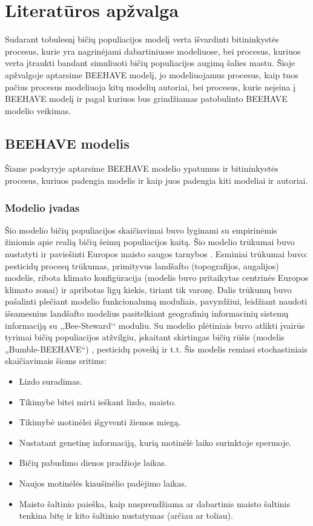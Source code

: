 \documentclass{VUMIFKompMagistrinis}
\begin{document}
\section{Literatūros apžvalga}

Sudarant tobulesnį bičių populiacijos modelį verta išvardinti bitininkystės procesus, kurie yra nagrinėjami dabartiniuose modeliuose, bei procesus, kuriuos verta įtraukti bandant simuliuoti bičių populiacijos augimą šalies mastu. Šioje apžvalgoje aptarsime BEEHAVE modelį, jo modeliuojamus procesus, kaip tuos pačius procesus modeliuoja kitų modelių autoriai, bei procesus, kurie neįeina į BEEHAVE modelį ir pagal kuriuos bus grindžiamas patobulinto BEEHAVE modelio veikimas.

\subsection{BEEHAVE modelis}

Šiame poskyryje aptarsime BEEHAVE modelio ypatumus ir bitininkystės procesus, kuriuos padengia modelis ir kaip juos padengia kiti modeliai ir autoriai.

\subsubsection{Modelio įvadas}

Šio modelio bičių populiacijos skaičiavimai buvo lyginami su empirinėmis žiniomis apie realią bičių šeimų populiacijos kaitą. Šio modelio trūkumai  buvo nustatyti ir paviešinti Europos maisto saugos tarnybos \cite{EFSA15}. Esminiai trūkumai buvo: pesticidų procesų trūkumas, primityvus landšafto (topografijos, augalijos) modelis, ribota klimato konfigūracija (modelis buvo pritaikytas centrinės Europos klimato zonai) ir apribotas ligų kiekis, tiriant tik varozę. Dalis trūkumų buvo pašalinti plečiant modelio funkcionalumą moduliais, pavyzdžiui, leidžiant naudoti išsamesnius landšafto modelius pasitelkiant geografinių informacinių sistemų informaciją su ,,Bee-Steward‘‘ moduliu. Su modelio plėtiniais buvo atlikti įvairūs tyrimai bičių populiacijos atžvilgiu, įskaitant skirtingas bičių rūšis (modelis „Bumble-BEEHAVE“) \cite{BDP18}, pesticidų poveikį \cite{RBT17} ir t.t.
Šis modelis remiasi stochastiniais skaičiavimais šioms sritims:
\begin{itemize}
    \item 	Lizdo suradimas.
    \item 	Tikimybė bitei mirti ieškant lizdo, maisto.
    \item   Tikimybė motinėlei išgyventi žiemos miegą.
    \item 	Nustatant genetinę informaciją, kurią motinėlė laiko surinktoje spermoje.
    \item 	Bičių pabudimo dienos pradžioje laikas.
    \item 	Naujos motinėlės kiaušinėlio padėjimo laikas.
    \item   Maisto šaltinio paieška, kaip nusprendžiama ar dabartinis maisto šaltinis tenkina bitę ir kito šaltinio nustatymas (arčiau ar toliau).
\end{itemize}
\end{document}
